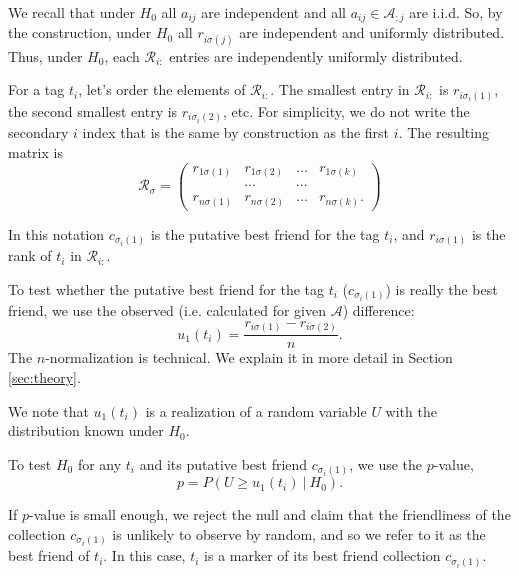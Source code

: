 \documentclass{llncs}
\begin{document}
We recall that under $H_0$ all $a_{ij}$ are independent and all $a_{ij} \in \mathcal{A}_{:j}$ are i.i.d. So, by the construction, under $H_0$ all $r_{i\sigma(j)}$ are independent and uniformly distributed.
Thus, under $H_0$, each $\mathcal{R}_{i:}$ entries are independently uniformly distributed. 

For a tag $t_i$, let's order the elements of $\mathcal{R}_{i:}$. The smallest entry in $\mathcal{R}_{i:}$ is $r_{i\sigma_i(1)}$, the second smallest entry is $r_{i\sigma_i(2)}$, etc. For simplicity, we do not write the secondary $i$ index that is the same by construction as the first $i$. The resulting matrix is 
\begin{equation}
\label{def:R_sigma}
\mathcal{R}_{\sigma} = \begin{pmatrix}
r_{1\sigma(1)} & r_{1\sigma(2)} & \dots & r_{1\sigma(k)} \\
       &\cdots & \cdots &  \\
r_{n\sigma(1)} & r_{n\sigma(2)} & \dots & r_{n\sigma(k)}.
\end{pmatrix}
\end{equation}

In this notation $c_{\sigma_i(1)}$ is the putative best friend for the tag $t_i$, and $r_{i\sigma(1)}$ is the rank of $t_i$ in $\mathcal{R}_{i:}$. 

To test whether the putative best friend for the tag $t_i$ ($c_{\sigma_i(1)}$) is really the best friend, we use the observed (i.e. calculated for given $\mathcal{A}$) difference:
\begin{equation}
\label{def:u_1}
u_1(t_i) = \frac{r_{i\sigma(1)} -  r_{i\sigma(2)}}{n}.
\end{equation}
The $n$-normalization is technical. We explain it in more detail in Section \ref{sec:theory}.

We note that $u_1(t_i)$ is a realization of a random variable $U$ with the distribution known under $H_0$.


To test $H_0$ for any $t_i$ and its putative best friend $c_{\sigma_{i}(1)}$, we use the $p$-value,
\[
p = P\left(U \ge u_1(t_i)~|~H_0\right). 
\]

If $p$-value is small enough, we reject the null and claim that the friendliness of the collection $c_{\sigma_{i}(1)}$ is unlikely to observe by random, and so we refer to it as the best friend of $t_i$. In this case, $t_i$ is a marker of its best friend collection $c_{\sigma_{i}(1)}$.
\end{document}
